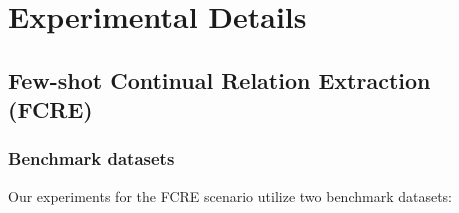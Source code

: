 
\section{Experimental Details}
    
\subsection{Few-shot Continual Relation Extraction (FCRE)}
\subsubsection{Benchmark datasets}
\label{app:data}
Our experiments for the FCRE scenario utilize two benchmark datasets:

